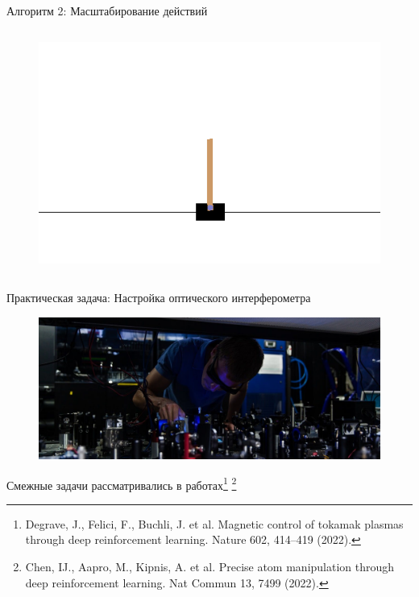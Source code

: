 \begin{frame}{Алгоритм 2: Масштабирование действий}
\begin{minipage}{\linewidth}
\begin{columns}
\begin{figure}
    \centering
    \includegraphics[width=1\linewidth]{Presentation/images/cartpole.png}
\end{figure}
\end{columns}
\end{minipage}


    
\end{frame}



\begin{frame}{Практическая задача: Настройка оптического интерферометра}
\vspace{-30pt}
\begin{figure}
  \centering
  \includegraphics[width=1\linewidth]{Presentation/images/labinterf.jpg}
\end{figure}
\vspace{-10pt}

\setcounter{footnote}{0} 
Смежные задачи рассматривались в работах\footnote{Degrave, J., Felici, F., Buchli, J. et al. Magnetic control of tokamak plasmas through deep reinforcement learning. Nature 602, 414–419 (2022).}
\footnote{Chen, IJ., Aapro, M., Kipnis, A. et al. Precise atom manipulation through deep reinforcement learning. Nat Commun 13, 7499 (2022).}
\end{frame}

